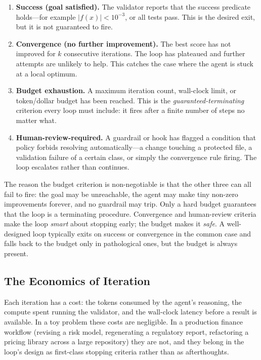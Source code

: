 \begin{enumerate}
  \item \textbf{Success (goal satisfied).} The validator reports that the success
        predicate holds---for example $|f(x)| < 10^{-3}$, or all tests pass. This
        is the desired exit, but it is not guaranteed to fire.
  \item \textbf{Convergence (no further improvement).} The best score has not
        improved for $k$ consecutive iterations. The loop has plateaued and
        further attempts are unlikely to help. This catches the case where the
        agent is stuck at a local optimum.
  \item \textbf{Budget exhaustion.} A maximum iteration count, wall-clock limit,
        or token/dollar budget has been reached. This is the
        \emph{guaranteed-terminating} criterion every loop must include: it fires
        after a finite number of steps no matter what.
  \item \textbf{Human-review-required.} A guardrail or hook has flagged a
        condition that policy forbids resolving automatically---a change touching
        a protected file, a validation failure of a certain class, or simply the
        convergence rule firing. The loop escalates rather than continues.
\end{enumerate}

The reason the budget criterion is non-negotiable is that the other three can all
fail to fire: the goal may be unreachable, the agent may make tiny non-zero
improvements forever, and no guardrail may trip. Only a hard budget guarantees
that the loop is a terminating procedure. Convergence and human-review criteria
make the loop \emph{smart} about stopping early; the budget makes it \emph{safe}.
A well-designed loop typically exits on success or convergence in the common case
and falls back to the budget only in pathological ones, but the budget is always
present.

\subsection{The Economics of Iteration}\label{subsec:economics-of-iteration}

Each iteration has a cost: the tokens consumed by the agent's reasoning, the
compute spent running the validator, and the wall-clock latency before a result
is available. In a toy problem these costs are negligible. In a production finance
workflow (revising a risk model, regenerating a regulatory report, refactoring a
pricing library across a large repository) they are not, and they belong in the
loop's design as first-class stopping criteria rather than as afterthoughts.

